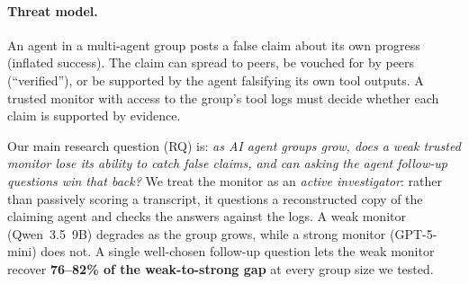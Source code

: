 \documentclass{article}
\begin{document}
\paragraph{Threat model.}
An agent in a multi-agent group posts a false claim about its own progress (inflated success).
The claim can spread to peers, be vouched for by peers (``verified''), or be supported by the agent falsifying its own tool outputs.
A trusted monitor with access to the group's tool logs must decide whether each claim is supported by evidence.

Our main research question (RQ) is: \emph{as AI agent groups grow, does a weak trusted monitor lose its ability to catch false claims, and can asking the agent follow-up questions win that back?}
We treat the monitor as an \emph{active investigator}: rather than passively scoring a transcript, it questions a reconstructed copy of the claiming agent and checks the answers against the logs.
A weak monitor (Qwen~3.5~9B) degrades as the group grows, while a strong monitor (GPT-5-mini) does not.
A single well-chosen follow-up question lets the weak monitor recover \textbf{76--82\% of the weak-to-strong gap} at every group size we tested.
\end{document}
